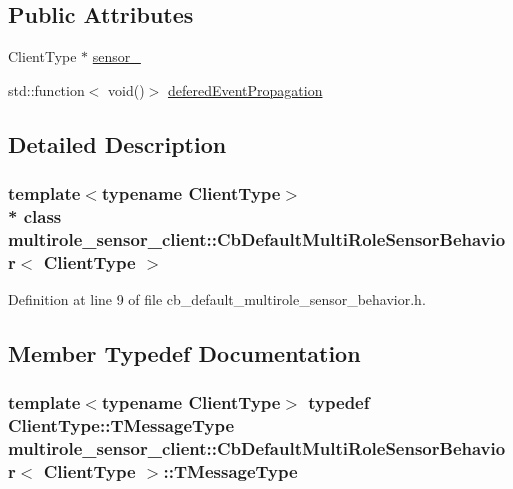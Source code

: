 \subsection*{Public Attributes}
\begin{DoxyCompactItemize}
\item 
Client\+Type $\ast$ \hyperlink{classmultirole__sensor__client_1_1CbDefaultMultiRoleSensorBehavior_a5e4e65ada73da49c2b8579b422b97d0d}{sensor\+\_\+}
\item 
std\+::function$<$ void()$>$ \hyperlink{classmultirole__sensor__client_1_1CbDefaultMultiRoleSensorBehavior_af49bfde7f78897b0e884faae69077013}{defered\+Event\+Propagation}
\end{DoxyCompactItemize}


\subsection{Detailed Description}
\subsubsection*{template$<$typename Client\+Type$>$\\*
class multirole\+\_\+sensor\+\_\+client\+::\+Cb\+Default\+Multi\+Role\+Sensor\+Behavior$<$ Client\+Type $>$}



Definition at line 9 of file cb\+\_\+default\+\_\+multirole\+\_\+sensor\+\_\+behavior.\+h.



\subsection{Member Typedef Documentation}
\subsubsection[{\texorpdfstring{T\+Message\+Type}{TMessageType}}]{\setlength{\rightskip}{0pt plus 5cm}template$<$typename Client\+Type$>$ typedef Client\+Type\+::\+T\+Message\+Type {\bf multirole\+\_\+sensor\+\_\+client\+::\+Cb\+Default\+Multi\+Role\+Sensor\+Behavior}$<$ Client\+Type $>$\+::{\bf T\+Message\+Type}}\hypertarget{classmultirole__sensor__client_1_1CbDefaultMultiRoleSensorBehavior_a8343b60b6962dd8a5588d8415dd33dd9}{}\label{classmultirole__sensor__client_1_1CbDefaultMultiRoleSensorBehavior_a8343b60b6962dd8a5588d8415dd33dd9}


